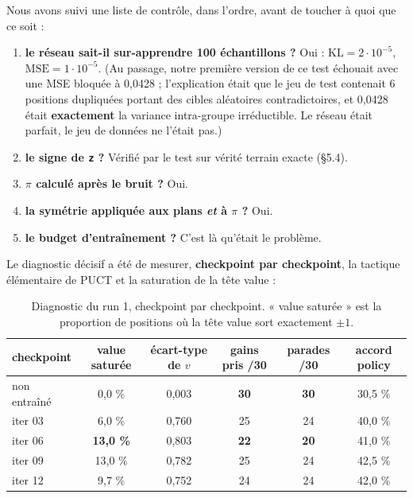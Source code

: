 \documentclass[11pt,a4paper]{article}
\begin{document}
Nous avons suivi une liste de contrôle, dans l'ordre, avant de toucher à
quoi que ce soit :

\begin{enumerate}
\def\labelenumi{\arabic{enumi}.}
\setlength{\itemsep}{1pt}\setlength{\parskip}{0pt}
\item
  \textbf{le réseau sait-il sur-apprendre 100 échantillons ?} Oui : $\mathrm{KL} = 2\cdot 10^{-5}$,
  $\mathrm{MSE} = 1\cdot 10^{-5}$. (Au passage, notre première version de ce test échouait avec une
  MSE bloquée à 0,0428 ; l'explication était que le jeu de test contenait 6
  positions dupliquées portant des cibles aléatoires contradictoires, et 0,0428
  était \textbf{exactement} la variance intra-groupe irréductible. Le réseau était
  parfait, le jeu de données ne l'était pas.)
\item
  \textbf{le signe de \texttt{z} ?} Vérifié par le test sur vérité terrain exacte (§5.4).
\item
  \textbf{$\pi$ calculé après le bruit ?} Oui.
\item
  \textbf{la symétrie appliquée aux plans \emph{et} à $\pi$ ?} Oui.
\item
  \textbf{le budget d'entraînement ?} C'est là qu'était le problème.
\end{enumerate}

Le diagnostic décisif a été de mesurer, \textbf{checkpoint par checkpoint}, la tactique
élémentaire de PUCT et la saturation de la tête value :

\begin{table}[htbp]
\centering\small
\caption{Diagnostic du run 1, checkpoint par checkpoint. « value saturée » est la proportion de positions où la tête value sort exactement $\pm 1$.}
\label{tab:diagnostic}
\begin{tabular}{@{}lccccc@{}}
\toprule
\textbf{checkpoint} & \textbf{value saturée} & \textbf{écart-type de $v$} & \textbf{gains pris /30} & \textbf{parades /30} & \textbf{accord policy} \\
\midrule
non entraîné & 0,0 \% & 0,003 & \textbf{30} & \textbf{30} & 30,5 \% \\
iter 03 & 6,0 \% & 0,760 & 25 & 24 & 40,0 \% \\
iter 06 & \textbf{13,0 \%} & 0,803 & \textbf{22} & \textbf{20} & 41,0 \% \\
iter 09 & 13,0 \% & 0,782 & 25 & 24 & 42,5 \% \\
iter 12 & 9,7 \% & 0,752 & 24 & 24 & 42,0 \% \\
\bottomrule
\end{tabular}
\end{table}
\end{document}
